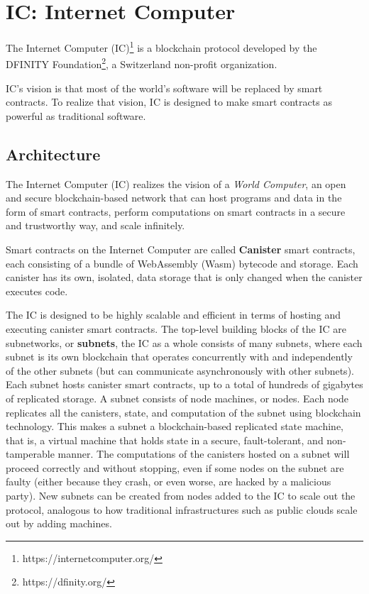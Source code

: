 \section{IC: Internet Computer}
\label{sec:icp}

The Internet Computer (IC)\footnote{https://internetcomputer.org/} is a blockchain protocol developed by the DFINITY Foundation\footnote{https://dfinity.org/}, a Switzerland non-profit organization.  

IC's vision is that most of the world's software will be replaced by smart contracts. To realize that vision, IC is designed to make smart contracts as powerful as traditional software. \cite{icp-vision}

\subsection{Architecture}

The Internet Computer (IC) realizes the vision of a \textit{World Computer}, an open and secure blockchain-based network that can host programs and data in the form of smart contracts, perform computations on smart contracts in a secure and trustworthy way, and scale infinitely.\cite{icp-how-it-works}

Smart contracts on the Internet Computer are called \textbf{Canister} smart contracts, each consisting of a bundle of WebAssembly (Wasm) bytecode and storage. Each canister has its own, isolated, data storage that is only changed when the canister executes code. \cite{icp-how-it-works}

The IC is designed to be highly scalable and efficient in terms of hosting and executing canister smart contracts. The top-level building blocks of the IC are subnetworks, or \textbf{subnets}, the IC as a whole consists of many subnets, where each subnet is its own blockchain that operates concurrently with and independently of the other subnets (but can communicate asynchronously with other subnets). Each subnet hosts canister smart contracts, up to a total of hundreds of gigabytes of replicated storage. A subnet consists of node machines, or nodes. Each node replicates all the canisters, state, and computation of the subnet using blockchain technology. This makes a subnet a blockchain-based replicated state machine, that is, a virtual machine that holds state in a secure, fault-tolerant, and non-tamperable manner. The computations of the canisters hosted on a subnet will proceed correctly and without stopping, even if some nodes on the subnet are faulty (either because they crash, or even worse, are hacked by a malicious party). New subnets can be created from nodes added to the IC to scale out the protocol, analogous to how traditional infrastructures such as public clouds scale out by adding machines. \cite{icp-architecture}

